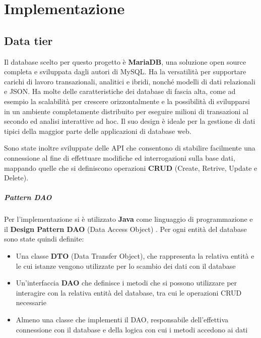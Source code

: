 
\chapter{Implementazione}


\section{Data tier}
Il database scelto per questo progetto è \textbf{MariaDB}, una soluzione open
source completa e sviluppata dagli autori di MySQL. Ha la versatilità per
supportare carichi di lavoro transazionali, analitici e ibridi, nonché modelli di
dati relazionali e JSON. Ha molte delle caratteristiche dei database di fascia alta,
come ad esempio la scalabilità per crescere orizzontalmente e la possibilità di
svilupparsi in un ambiente completamente distribuito per eseguire milioni di
transazioni al secondo ed analisi interattive ad hoc. Il suo design è ideale per
la gestione di dati tipici della maggior parte delle applicazioni di database web.

Sono state inoltre sviluppate delle API che consentono di stabilire facilmente
una connessione al fine di effettuare modifiche ed interrogazioni sulla base dati,
mappando quelle che si definiscono operazioni \textbf{CRUD} (Create, Retrive, Update e Delete).

\paragraph{Pattern DAO}
Per l'implementazione si è utilizzato \textbf{Java} come linguaggio di programmazione
e il \textbf{Design Pattern DAO} (Data Access Object) \cite{J2EE-design-patterns}.
Per ogni entità del database sono state quindi definite:
\begin{itemize}
	\item Una classe \textbf{DTO} (Data Transfer Object), che rappresenta la
	relativa entità e le cui istanze vengono utilizzate per lo scambio dei dati
	con il database
	\item Un'interfaccia \textbf{DAO} che definisce i metodi che si possono
	utilizzare per interagire con la relativa entità del database, tra cui le
	operazioni CRUD necessarie
	\item Almeno una classe che implementi il DAO, responsabile dell'effettiva
	connessione con il database e della logica con cui i metodi accedono ai dati
\end{itemize}

